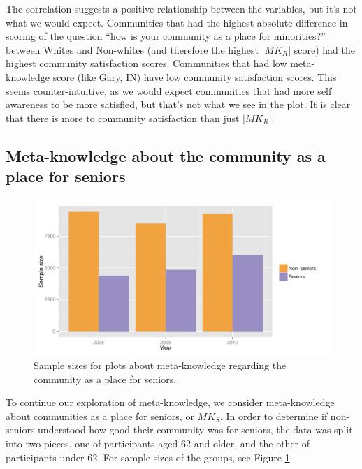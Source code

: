 \documentclass[smallextended]{svjour3}\usepackage[]{graphicx}\usepackage[]{color}
\newenvironment{knitrout}{}{} %
\begin{document}
The correlation suggests a positive relationship between the variables, but it's not what we would expect. Communities that had the highest absolute difference in scoring of the question ``how is your community as a place for minorities?'' between Whites and Non-whites (and therefore the highest $|MK_R|$ score) had the highest community satisfaction scores. Communities that had low meta-knowledge score (like Gary, IN) have low community satisfaction scores. This seems counter-intuitive, as we would expect communities that had more self awareness to be more satisfied, but that's not what we see in the plot. It is clear that there is more to community satisfaction than just $|MK_R|$. 


\subsection{Meta-knowledge about the community as a place for seniors}
\label{mseniors}



\begin{knitrout}
\color{fgcolor}\begin{figure}

{\centering \includegraphics[width=0.99\linewidth]{figure/seniorSS-1} 

}

\caption[Sample sizes for plots about meta-knowledge regarding the community as a place for seniors]{Sample sizes for plots about meta-knowledge regarding the community as a place for seniors.}\label{fig:seniorSS}
\end{figure}


\end{knitrout}




To continue our exploration of meta-knowledge, we consider meta-knowledge about communities as a place for seniors, or $MK_S$. In order to determine if non-seniors understood how good their community was for seniors, the data was split into two pieces, one of participants aged 62 and older, and the other of participants under 62. For sample sizes of the groups, see Figure \ref{fig:seniorSS}.
\end{document}
